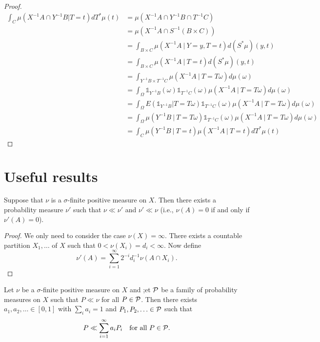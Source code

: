 \documentclass[twoside, a4paper, 10pt]{amsart}
\begin{document}
\begin{eg}
\begin{proof}
\begin{align*} \int_{C} \mu(X^{-1}A \cap Y^{-1}B | T=t) dT^*\mu(t) &= \mu(X^{-1}A \cap Y^{-1}B \cap T^{-1}C) \\ 
&=\mu(X^{-1}A \cap S^{-1}(B \times C))  \\
&= \int_{B \times C} \mu(X^{-1}A~|~ Y=y, T=t) d(S^*\mu)(y,t) \\ 
&= \int_{B \times C} \mu(X^{-1}A~|~ T=t) d(S^*\mu)(y,t) \\ 
&= \int_{Y^{-1}B \times T^{-1}C} \mu(X^{-1}A~|~ T=T\omega) d\mu(\omega) \\
&= \int_{\Omega} \mathds{1}_{Y^{-1}B}(\omega) \mathds{1}_{T^{-1}C}(\omega) \mu(X^{-1}A~|~ T=T\omega) d\mu(\omega) \\
&=\int_{\Omega} E(\mathds{1}_{Y^{-1}B}|T=T\omega) \mathds{1}_{T^{-1}C}(\omega) \mu(X^{-1}A~|~ T=T\omega) d\mu(\omega) \\ 
&= \int_{\Omega} \mu(Y^{-1}B ~|~ T=T\omega) \mathds{1}_{T^{-1}C}(\omega) \mu(X^{-1}A~|~ T=T\omega) d\mu(\omega) \\ 
&= \int_{C} \mu(Y^{-1}B~|~ T=t) \mu(X^{-1}A ~|~ T=t) dT^*\mu(t) \end{align*}

\end{proof}

\end{eg}

\section{Useful results}

\begin{lemma} Suppose that $\nu$ is a $\sigma$-finite positive measure on $X$. Then there exists a probability measure $\nu'$ such that $\nu \ll \nu'$ and $\nu' \ll \nu$ (i.e., $\nu(A) = 0$ if and only if $\nu'(A) = 0$).

\end{lemma}

\begin{proof} We only need to consider the case $\nu(X) = \infty$. There exists a countable partition $X_1, \ldots$ of $X$ such that $0< \nu(X_i) = d_i < \infty$. Now define $$\nu'(A) = \sum_{i=1}^{\infty} 2^{-i}d_i^{-1} \nu(A \cap X_i).$$

\end{proof}

\begin{lemma} \label{lemma: countable sum dominates} Let $\nu$ be a $\sigma$-finite positive measure on $X$ and ;et $\mathcal{P}$ be a family of probability measures on $X$ such that $P \ll \nu$ for all $P \in \mathcal{P}$. Then there exists $a_1,a_2,\ldots \in [0,1]$ with $\sum_{i} a_i = 1$ and $P_1,P_2, \ldots \in \mathcal{P}$ such that $$P \ll \sum_{i=1}^{\infty} a_i P_i \quad \text{for all } P \in \mathcal{P}.$$

\end{lemma}
\end{document}
